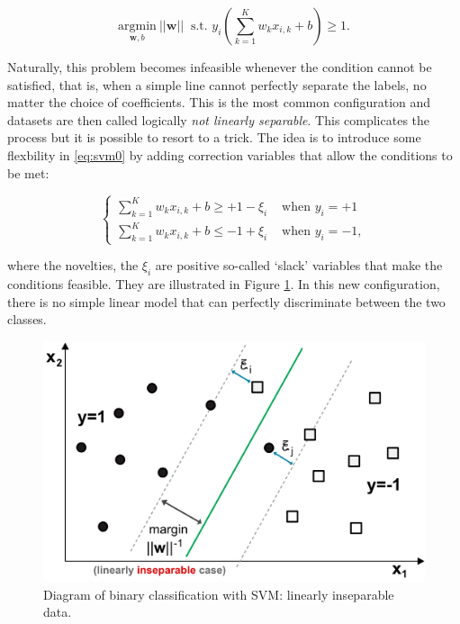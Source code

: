 \documentclass[]{krantz}
\theoremstyle{definition}
\theoremstyle{definition}
\theoremstyle{definition}
\theoremstyle{remark}
\begin{document}
\begin{equation}
\label{eq:svm1}
\underset{\textbf{w}, b}{\text{argmin}} \ ||\textbf{w}|| \ \text{ s.t. } y_i\left(\sum_{k=1}^Kw_kx_{i,k}+b \right)\ge 1.
\end{equation}

Naturally, this problem becomes infeasible whenever the condition cannot
be satisfied, that is, when a simple line cannot perfectly separate the
labels, no matter the choice of coefficients. This is the most common
configuration and datasets are then called logically \emph{not linearly
separable}. This complicates the process but it is possible to resort to
a trick. The idea is to introduce some flexbility in \eqref{eq:svm0} by
adding correction variables that allow the conditions to be met:

\begin{equation}
\label{eq:svm2}
\left\{\begin{array}{lll}
\sum_{k=1}^Kw_kx_{i,k}+b \ge +1-\xi_i & \text{ when } y_i=+1 \\
\sum_{k=1}^Kw_kx_{i,k}+b \le -1+\xi_i & \text{ when } y_i=-1,
\end{array}\right.
\end{equation}

where the novelties, the \(\xi_i\) are positive so-called `slack'
variables that make the conditions feasible. They are illustrated in
Figure \ref{fig:svmscheme2}. In this new configuration, there is no
simple linear model that can perfectly discriminate between the two
classes.

\begin{figure}[H]

{\centering \includegraphics[width=500px]{images/svm2} 

}

\caption{Diagram of binary classification with SVM: linearly inseparable data.}\label{fig:svmscheme2}
\end{figure}
\end{document}
